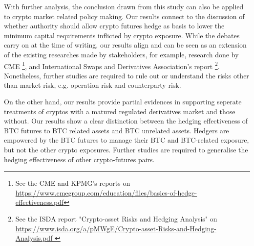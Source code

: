 \documentclass[11pt,a4paper,english]{article}
\begin{document}
With further analysis, the conclusion drawn from this study can also be applied to crypto market related policy making.
Our results connect to the discussion of whether authority should allow crypto futures hedge as basis to lower the minimum capital requirements inflicted by crypto exposure.
While the debates carry on at the time of writing, our results align and can be seen as an extension of the existing researches made by stakeholders,
for example, research done by CME \footnote{See the CME and KPMG's reports on \url{https://www.cmegroup.com/education/files/basics-of-hedge-effectiveness.pdf}},
and International Swaps and Derivatives Association's report \footnote{See the ISDA report "Crypto-asset Risks and Hedging Analysis" on \url{https://www.isda.org/a/pMWgE/Crypto-asset-Risks-and-Hedging-Analysis.pdf }}.
Nonetheless, further studies are required to rule out or understand the risks other than market risk, e.g. operation risk and counterparty risk. 

On the other hand, our results provide partial evidences in supporting seperate treatments of cryptos with a matured regulated derivatives market and those without. 
Our results show a clear distinction between the hedging effectiveness of BTC futures to BTC related assets and BTC unrelated assets. 
Hedgers are empowered by the BTC futures to manage their BTC and BTC-related exposure, but not the other crypto exposures.
Further studies are required to generalise the hedging effectiveness of other crypto-futures pairs. 









\end{document}
